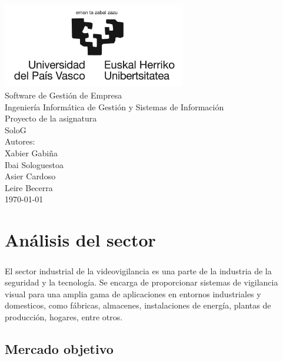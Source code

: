 \documentclass{report}
\begin{document}
    \begin{titlepage}
        \centering
        \includegraphics[width=0.6\textwidth]{./img/logo.jpg}\\
        \vspace{1cm}
        \LARGE Software de Gestión de Empresa\\
        \vspace{0.5cm}
        \Large Ingeniería Informática de Gestión y Sistemas de Información\\
        \vspace{3cm}
        \Huge Proyecto de la asignatura\\
        \huge SoloG\\
        \vspace{2.5cm}
        \Large Autores:\\
        \vspace{0.2cm}
        \large Xabier Gabiña\\
        \large Ibai Sologuestoa\\
        \large Asier Cardoso\\
        \large Leire Becerra\\
        \vfill
        \today
    \end{titlepage}
    \tableofcontents
    \listoffigures
    \listoftables
    \chapter{Análisis del sector}
      \paragraph*{}{El sector industrial de la videovigilancia es una parte de la industria de la seguridad y la tecnología. Se encarga de proporcionar sistemas de vigilancia visual para una amplia gama de aplicaciones en entornos industriales y domesticos, como fábricas, almacenes, instalaciones de energía, plantas de producción, hogares, entre otros.}
      \section{Mercado objetivo}
\end{document}

